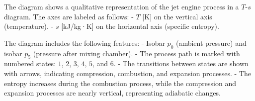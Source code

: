 The diagram shows a qualitative representation of the jet engine process in a \( T \)-\( s \) diagram. The axes are labeled as follows:  
- \( T \) [K] on the vertical axis (temperature).  
- \( s \) [kJ/kg·K] on the horizontal axis (specific entropy).  

The diagram includes the following features:  
- Isobar \( p_0 \) (ambient pressure) and isobar \( p_5 \) (pressure after mixing chamber).  
- The process path is marked with numbered states: \( 1 \), \( 2 \), \( 3 \), \( 4 \), \( 5 \), and \( 6 \).  
- The transitions between states are shown with arrows, indicating compression, combustion, and expansion processes.  
- The entropy increases during the combustion process, while the compression and expansion processes are nearly vertical, representing adiabatic changes.